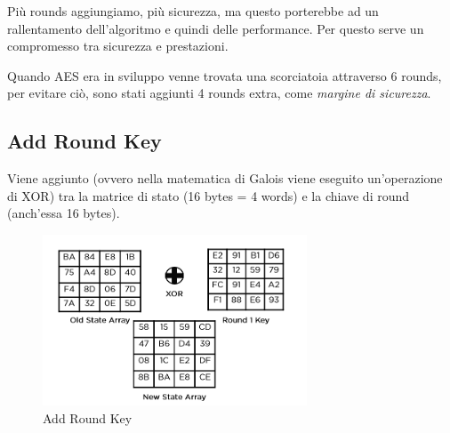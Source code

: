 
\textsf{\small Più rounds aggiungiamo, più sicurezza, ma questo porterebbe ad un rallentamento dell'algoritmo e quindi delle performance.}
\textsf{\small Per questo serve un compromesso tra sicurezza e prestazioni.}

 

\textsf{\small Quando AES era in sviluppo venne trovata una scorciatoia attraverso 6 rounds, per evitare ciò, sono stati aggiunti 4 rounds extra, come \emph{margine di sicurezza}.} %




\subsection{Add Round Key}

    

\textsf{\small Viene aggiunto (ovvero nella matematica di Galois viene eseguito un'operazione di XOR) tra la matrice di stato (16 bytes = 4 words) e la chiave di round (anch'essa 16 bytes).}

\begin{figure}[H]
	\centering
	\includegraphics[width=0.7\textwidth, height=0.7\textheight, keepaspectratio]{./images/aes/add_round_key.png} %
	\caption{Add Round Key}
	\label{fig:add_round_key2}
\end{figure}

